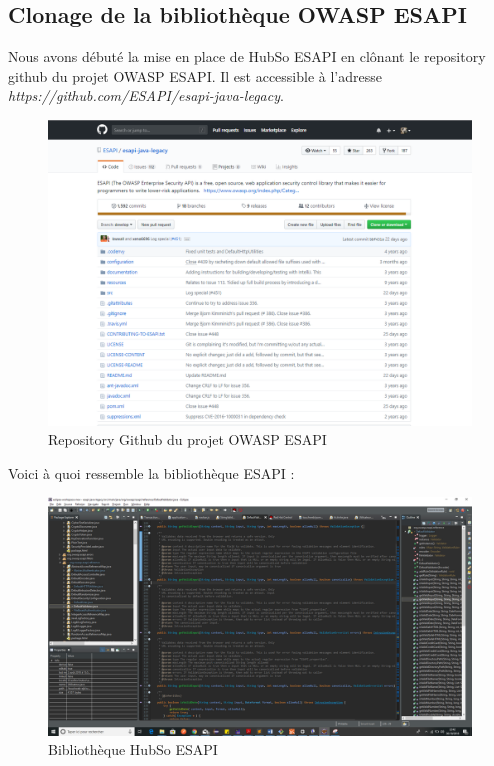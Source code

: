 \subsection{Clonage de la bibliothèque OWASP ESAPI}
Nous avons débuté la mise en place de HubSo ESAPI en clônant le repository github du projet OWASP ESAPI. Il est accessible à l'adresse \textit{https://github.com/ESAPI/esapi-java-legacy}.
\begin{figure}[H]
	\centering
	\begin{minipage}{12cm}
		\centering
		\includegraphics[width=1\textwidth]{fig/ESAPI-GIT.PNG}
	\end{minipage}
	\caption{Repository Github du projet OWASP ESAPI}
	\label{fig:vdf}
\end{figure}
Voici à quoi ressemble la bibliothèque ESAPI :
\begin{figure}[H]
	\centering
	\begin{minipage}{12cm}
		\centering
		\includegraphics[width=1\textwidth]{fig/eclipse-esapi.png}
	\end{minipage}
	\caption{Bibliothèque HubSo ESAPI}
	\label{fig:vcdf}
\end{figure}
